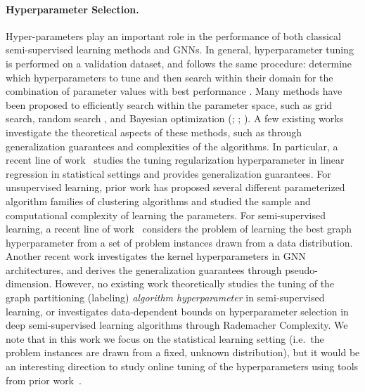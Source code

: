 \paragraph{Hyperparameter Selection.} Hyper-parameters %
play an important role in the performance of both classical semi-supervised learning methods and GNNs. 
In general, hyperparameter tuning is performed on a validation dataset, and follows the same procedure: determine which hyperparameters to tune and then search within their domain for the combination of parameter values with best performance \citep{yu2020hyperparameteroptimizationreviewalgorithms}. Many methods have been proposed to efficiently search within the parameter space, such as grid search, random search \citep{JMLR:v13:bergstra12a}, and Bayesian optimization (\cite{Mockus1974bayesian}; \cite{Mockus1978application}; \cite{jones1998efficient}). A few existing works investigate the theoretical aspects of these methods, such as through generalization guarantees and complexities of the algorithms. In particular, a recent line of work~\citep{balcan2024provablytuningelasticnetinstances,balcan2023new} studies the tuning regularization hyperparameter in linear regression in statistical settings and provides generalization guarantees. For unsupervised learning, prior work \citep{balcan2019datadrivenclusteringparameterizedlloyds,balcan2020learning,balcan2024accelerating} has proposed several different parameterized algorithm families of clustering algorithms and studied the sample and computational complexity of learning the parameters. For semi-supervised learning, a recent line of work~\citep{balcan2021data,sharma2023efficiently} considers the problem of learning the best graph hyperparameter from a set of problem instances drawn from a data distribution. Another recent work \citep{balcan2025samplecomplexitydatadriventuning} investigates the kernel hyperparameters in GNN architectures, and derives the generalization guarantees through pseudo-dimension. However, no existing work theoretically studies the tuning of the graph partitioning (labeling) \textit{algorithm hyperparameter} in semi-supervised learning, or investigates data-dependent bounds on hyperparameter selection in deep semi-supervised learning algorithms through Rademacher Complexity. We note that in this work we focus on the statistical learning setting (i.e.\ the problem instances are drawn from a fixed, unknown distribution), but it would be an interesting direction to study online tuning of the hyperparameters using tools from prior work~\citep{balcan2018dispersion,sharma2020learning,sharma2025offline}.